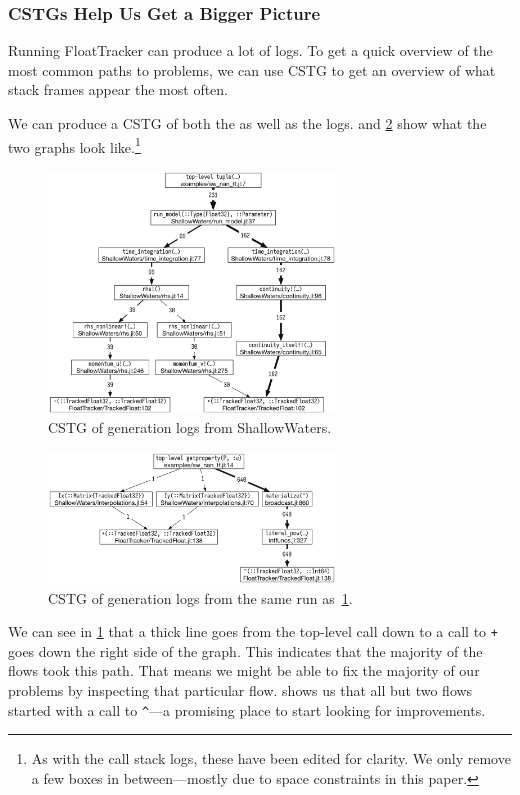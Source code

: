 \documentclass{juliacon}
\begin{document}
\subsubsection{CSTGs Help Us Get a Bigger Picture}

Running FloatTracker can produce a lot of logs.
To get a quick overview of the most common paths to problems, we can use CSTG to get an overview of what stack frames appear the most often.

We can produce a CSTG of both the \Inf{} as well as the \NaN{} logs.
 and \cref{fig:sw_inf_cstg} show what the two graphs look like.\footnote{As with the call stack logs, these have been edited for clarity. We only remove a few boxes in between—mostly due to space constraints in this paper.}


\begin{figure}[ht]
  \centering
  \includegraphics[width=3in]{fig/sw_nan_cstg_clean.png}
  \caption{CSTG of \NaN{} generation logs from ShallowWaters.}
  \label{fig:sw_nan_cstg}
\end{figure}

\begin{figure}[ht]
  \centering
  \includegraphics[width=3in]{fig/sw_inf_cstg_clean.png}
  \caption{CSTG of \Inf{} generation logs from the same run as~\cref{fig:sw_nan_cstg}.}
  \label{fig:sw_inf_cstg}
\end{figure}

We can see in \cref{fig:sw_nan_cstg} that a thick line goes from the top-level call down to a call to \texttt{+} goes down the right side of the graph.
This indicates that the majority of the flows took this path.
That means we might be able to fix the majority of our problems by inspecting that particular flow.
 shows us that all but two flows started with a call to \texttt{\^}---a promising place to start looking for improvements.
\end{document}
